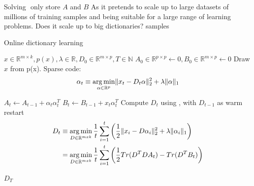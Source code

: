 Solving $ $ 
only store $A$ and $B$ 
As it pretends to scale up to large datasets of millions of training samples
and being suitable for a large range of learning problems.
Does it scale up to big dictionaries?
samples\cite{Mairal2010}
\begin{algorithm}[H]
\caption[\trainDL]{Online dictionary learning\cite{Mairal2010}}
\label{alg:trainDL}
\begin{algorithmic}[1]
\REQUIRE $x \in \mathbb{R}^{m \times k},  p \left( x \right), \lambda \in \mathbb{R}, D_0 \in \mathbb{R}^{m \times p}, T \in \mathbb{N}$
\STATE $A_0 \in \mathbb{R}^{p \times p} \gets  0, B_0 \in \mathbb{R}^{m \times p}\gets 0$
\STATE Draw $x$ from p(x).
\STATE Sparse code:
\begin{align*} 
\alpha_t \equiv \operatorname*{arg\,min}_{\alpha\in\mathbb{R}^{p}}  \lVert x_t - D_t\alpha \rVert^{2}_{2}  +  \lambda \lVert \alpha \rVert_{1}
\end{align*}

\STATE $A_t \gets A_{t-1} + \alpha_t\alpha_t^T$\label{alg:Aupdate}
\STATE $B_t \gets B_{t-1} + x_t\alpha_t^T$\label{alg:Bupdate}
\STATE Compute $D_t$ using , with $D_{t-1}$ as warm restart 
\begin{equation}
\begin{split}
D_t  & \equiv \operatorname*{arg\,min}_{D \in \mathbb{R}^{m x k}}  \frac{1}{t} \sum_{i=1}^t
\left( \frac{1}{2} \lVert x_i - D\alpha_i \rVert^{2}_{2}  +  \lambda \lVert
\alpha_i \rVert_{1} \right) \\
& = \operatorname*{arg\,min}_{D \in \mathbb{R}^{m x k}}  \frac{1}{t} \sum_{i=1}^t
\left( \frac{1}{2} Tr(D^TDA_t) - Tr(D^TB_t)\right) \label{eq:update}
\end{split}
\end{equation}
 
\ENDFOR
\RETURN $D_T$
\end{algorithmic}
\end{algorithm}


